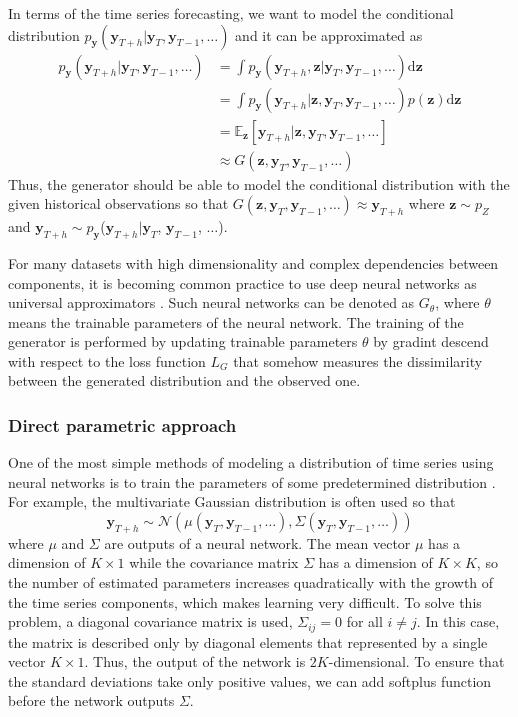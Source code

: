 \documentclass[12pt,a4paper]{article}
\begin{document}
In terms of the time series forecasting, we want to model the conditional distribution $p_\mathbf y(\mathbf y_{T+h} | \mathbf y_{T}, \mathbf y_{T-1}, \dots)$ and it can be approximated as
\begin{equation}\label{eq:gen}
\begin{aligned}
p_\mathbf y(\mathbf y_{T+h} | \mathbf y_{T}, \mathbf y_{T-1}, \dots) &= \int p_\mathbf y(\mathbf y_{T+h}, \mathbf z| \mathbf y_{T}, \mathbf y_{T-1}, \dots)\mathrm{d}\mathbf z\\ 
&= \int p_\mathbf y(\mathbf y_{T+h} | \mathbf z, \mathbf y_{T}, \mathbf y_{T-1}, \dots)p(\mathbf z) \mathrm{d}\mathbf z\\ 
&= \mathbb E_\mathbf z[\mathbf y_{T+h} | \mathbf z, \mathbf y_{T}, \mathbf y_{T-1}, \dots]\\ 
&\approx G(\mathbf z, \mathbf y_{T}, \mathbf y_{T-1}, \dots)        
\end{aligned}
\end{equation}
Thus, the generator should be able to model the conditional distribution with the given historical observations so that $G(\mathbf z, \mathbf y_{T}, \mathbf y_{T-1}, \dots) \approx \mathbf y_{T+h}$ where $\mathbf z \sim p_Z$ and $\mathbf y_{T+h} \sim p_\mathbf y$($\mathbf y_{T+h} | \mathbf y_{T}$, $\mathbf y_{T-1}$, $\dots$).

For many datasets with high dimensionality and complex dependencies between components, it is becoming common practice to use deep neural networks as universal approximators \cite{introductiondgm2021}. Such neural networks can be denoted as $G_\theta$, where $\theta$ means the trainable parameters of the neural network. The training of the generator is performed by updating trainable parameters $\theta$ by gradint descend with respect to the loss function $L_G$ that somehow measures the dissimilarity between the generated distribution and the observed one.

\subsubsection{Direct parametric approach}

One of the most simple methods of modeling a distribution of time series using neural networks is to train the parameters of some predetermined distribution \cite{tsdeeplearning2021}. For example, the multivariate Gaussian distribution is often used so that
$$\mathbf y_{T+h} \sim \mathcal N(\mu(\mathbf y_{T}, \mathbf y_{T-1}, \dots), \Sigma(\mathbf y_{T}, \mathbf y_{T-1}, \dots))$$
where $\mu$ and $\Sigma$ are outputs of a neural network. The mean vector $\mu$ has a dimension of $K \times 1$ while the covariance matrix $\Sigma$ has a dimension of $K \times K$, so the number of estimated parameters increases quadratically with the growth of the time series components, which makes learning very difficult. To solve this problem, a diagonal covariance matrix is used, $\Sigma_{ij} = 0$ for all $i \neq j$. In this case, the matrix is described only by diagonal elements that represented by a single vector $K \times 1$. Thus, the output of the network is $2K$-dimensional. To ensure that the standard deviations take only positive values, we can add softplus function before the network outputs $\Sigma$.
\end{document}
